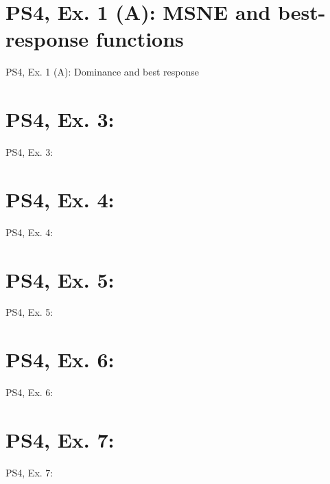 \section{PS4, Ex. 1 (A): MSNE and best-response functions}

\begin{frame}{PS4, Ex. 1 (A): Dominance and best response}

\end{frame}


\section{PS4, Ex. 3: }

\begin{frame}{PS4, Ex. 3: }

\end{frame}


\section{PS4, Ex. 4: }

\begin{frame}{PS4, Ex. 4: }

\end{frame}


\section{PS4, Ex. 5: }

\begin{frame}{PS4, Ex. 5: }

\end{frame}


\section{PS4, Ex. 6: }

\begin{frame}{PS4, Ex. 6: }

\end{frame}


\section{PS4, Ex. 7: }

\begin{frame}{PS4, Ex. 7: }

\end{frame}


